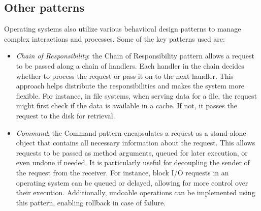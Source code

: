\subsection{Other patterns}
Operating systems also utilize various behavioral design patterns to manage complex interactions and processes. 
Some of the key patterns used are:
\begin{itemize}
    \item \textit{Chain of Responsibility}: the Chain of Responsibility pattern allows a request to be passed along a chain of handlers. 
        Each handler in the chain decides whether to process the request or pass it on to the next handler. 
        This approach helps distribute the responsibilities and makes the system more flexible.
        For instance, in file systems, when serving data for a file, the request might first check if the data is available in a cache. 
        If not, it passes the request to the disk for retrieval.
    \item \textit{Command}: the Command pattern encapsulates a request as a stand-alone object that contains all necessary information about the request. 
        This allows requests to be passed as method arguments, queued for later execution, or even undone if needed. 
        It is particularly useful for decoupling the sender of the request from the receiver.
        For instance, block I/O requests in an operating system can be queued or delayed, allowing for more control over their execution. 
        Additionally, undoable operations can be implemented using this pattern, enabling rollback in case of failure.
\end{itemize}